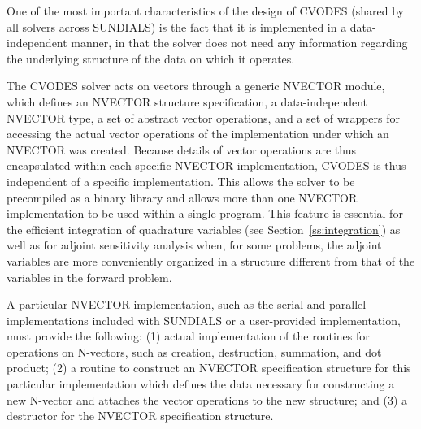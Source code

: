 One of the most important characteristics of the design of CVODES 
(shared by all solvers across SUNDIALS) is the fact that it is implemented 
in a data-independent manner, in that the solver does not need any information
regarding the underlying structure of the data on which it operates.

The CVODES solver acts on vectors through a generic NVECTOR module,
which defines an NVECTOR structure specification, a data-independent NVECTOR type, 
a set of abstract vector operations, and a set of wrappers for accessing the actual vector
operations of the implementation under which an NVECTOR was created. Because
details of vector operations are thus encapsulated within each specific
NVECTOR implementation, CVODES is thus independent of a specific
implementation. This allows the solver to be precompiled as a binary
library and allows more than one NVECTOR implementation to be used within
a single program. This feature is essential for the efficient integration of
quadrature variables (see Section~\ref{ss:integration}) as well as for
adjoint sensitivity analysis when, for some problems, the adjoint variables
are more conveniently organized in a structure different from that of
the variables in the forward problem.

A particular NVECTOR implementation, such as the serial and parallel 
implementations included with SUNDIALS or a user-provided implementation,
must provide the following:
(1) actual implementation of the routines for operations on N-vectors, 
such as creation, destruction, summation, and dot product;
(2) a routine to construct an NVECTOR specification structure
for this particular implementation which defines the data necessary
for constructing a new N-vector and attaches the vector operations
to the new structure; and
(3) a destructor for the NVECTOR specification structure.

